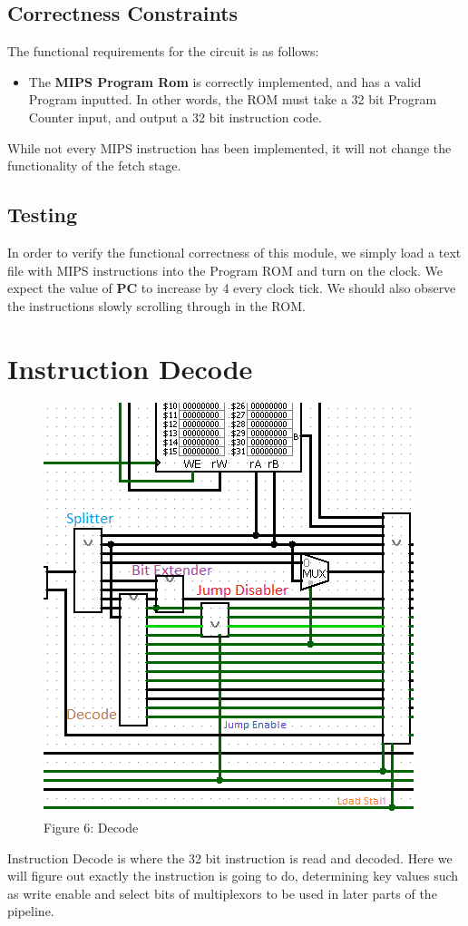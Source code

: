 \documentclass{article}
\begin{document}
\subsection{Correctness Constraints}
The functional requirements for the circuit is as follows:
\begin{itemize}
\item
The \textbf{MIPS Program Rom} is correctly implemented, and has a valid Program inputted. In other words, the ROM must take a 32 bit Program Counter input, and output a 32 bit instruction code. 
\end{itemize}
While not every MIPS instruction has been implemented, it will not change the functionality of the fetch stage. 

\subsection{Testing}
In order to verify the functional correctness of this module, we simply load a text file with MIPS instructions into the Program ROM and turn on the clock. We expect the value of \textbf{PC} to increase by 4 every clock tick. We should also observe the instructions slowly scrolling through in the ROM.

\section{Instruction Decode}
\begin{figure}
\vspace{-2.1cm}
\begin{center}
\includegraphics[scale=0.75]{DecodeOut.png} \\
Figure 6: Decode
\end{center}
\vspace{-4cm}
\end{figure}
Instruction Decode is where the 32 bit instruction is read and decoded. Here we will figure out exactly the instruction is going to do, determining key values such as write enable and select bits of multiplexors to be used in later parts of the pipeline. 
\end{document}
